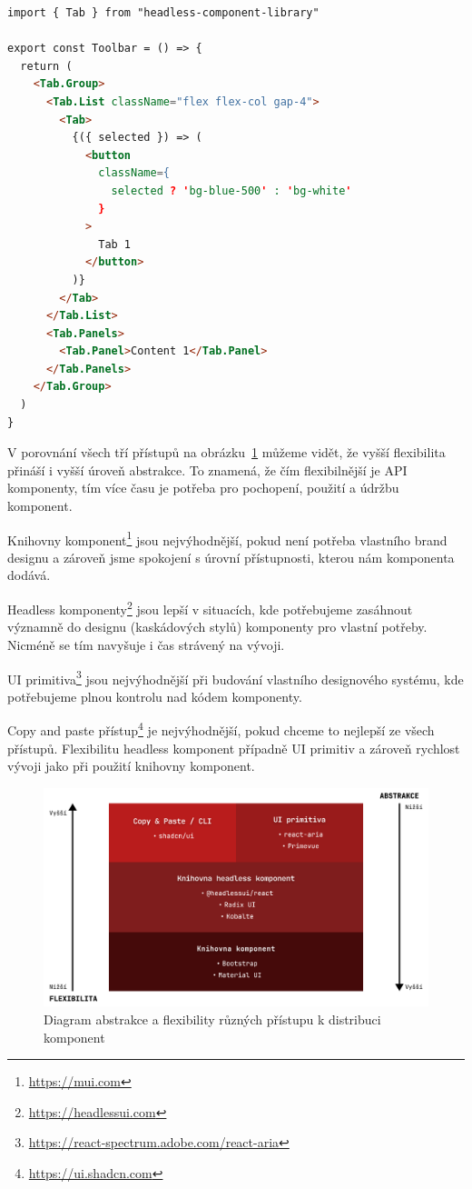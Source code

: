 \begin{lstlisting}[caption={Ukázka použití headless knihovny}, label={component-distribution-2}, language=html]
import { Tab } from "headless-component-library"

export const Toolbar = () => {
  return (
    <Tab.Group>
      <Tab.List className="flex flex-col gap-4">
        <Tab>
          {({ selected }) => (
            <button
              className={
                selected ? 'bg-blue-500' : 'bg-white'
              }
            >
              Tab 1
            </button>
          )}
        </Tab>
      </Tab.List>
      <Tab.Panels>
        <Tab.Panel>Content 1</Tab.Panel>
      </Tab.Panels>
    </Tab.Group>
  )
}
\end{lstlisting}

\clearpage

V porovnání všech tří přístupů na obrázku~\ref{component-lib-distribution-comparison} můžeme vidět, že vyšší flexibilita přináší i vyšší úroveň abstrakce.
To znamená, že čím flexibilnější je API komponenty, tím více času je potřeba pro pochopení, použití a údržbu komponent.

Knihovny komponent\footnote{\url{https://mui.com}} jsou nejvýhodnější, pokud není potřeba vlastního brand designu a zároveň jsme spokojení s úrovní přístupnosti, kterou nám komponenta dodává.

Headless komponenty\footnote{\url{https://headlessui.com}} jsou lepší v situacích, kde potřebujeme zasáhnout významně do designu (kaskádových stylů) komponenty pro vlastní potřeby.
Nicméně se tím navyšuje i čas strávený na vývoji.

UI primitiva\footnote{\url{https://react-spectrum.adobe.com/react-aria}} jsou nejvýhodnější při budování vlastního designového systému, kde potřebujeme plnou kontrolu nad kódem komponenty.

Copy and paste přístup\footnote{\url{https://ui.shadcn.com}} je nejvýhodnější, pokud chceme to nejlepší ze všech přístupů.
Flexibilitu headless komponent případně UI primitiv a zároveň rychlost vývoji jako při použití knihovny komponent.

\begin{figure}[h]
      \centering
      \includegraphics[width=\textwidth]{./assets/figures/component-lib-distribution-comparison.png}
      \captionsetup{justification=centering}
      \caption{Diagram abstrakce a flexibility různých přístupu k distribuci komponent}
      \label{component-lib-distribution-comparison}
\end{figure}


